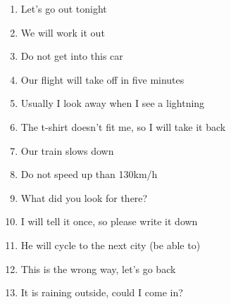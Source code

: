 \documentclass{tstextbook}
\begin{document}
\begin{programming}
	\begin{enumerate}
		\item Let's go out tonight
		\item We will work it out
		\item Do not get into this car
		\item Our flight will take off in five minutes
		\item Usually I look away when I see a lightning
		\item The t-shirt doesn't fit me, so I will take it back
		\item Our train slows down
		\item Do not speed up than 130km/h
		\item What did you look for there?
		\item I will tell it once, so please write it down
		\item He will cycle to the next city (be able to)
		\item This is the wrong way, let's go back
		\item It is raining outside, could I come in?
	\end{enumerate}
\end{programming}
	
	
	
	
	\printindex
	
\end{document}
